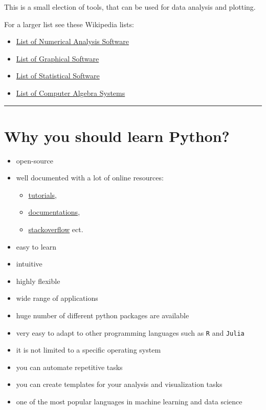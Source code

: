 \documentclass[
  letterpaper,
  DIV=11,
  numbers=noendperiod]{scrreprt}
\providecommand{\tightlist}{%
  \setlength{\itemsep}{0pt}\setlength{\parskip}{0pt}}\usepackage{longtable,booktabs,array}
\begin{document}
This is a small election of tools, that can be used for data analysis
and plotting.

For a larger list see these Wikipedia lists:

\begin{itemize}
\tightlist
\item
  \href{https://en.wikipedia.org/wiki/List_of_numerical_analysis_software}{List
  of Numerical Analysis Software}
\item
  \href{https://en.wikipedia.org/wiki/List_of_information_graphics_software}{List
  of Graphical Software}
\item
  \href{https://en.wikipedia.org/wiki/List_of_statistical_software}{List
  of Statistical Software}
\item
  \href{https://en.wikipedia.org/wiki/List_of_computer_algebra_systems}{List
  of Computer Algebra Systems}
\end{itemize}

\begin{center}\rule{0.5\linewidth}{0.5pt}\end{center}

\chapter*{Why you should learn
Python?}\label{why-you-should-learn-python}


\begin{itemize}
\tightlist
\item
  open-source
\item
  well documented with a lot of online resources:

  \begin{itemize}
  \tightlist
  \item
    \href{https://github.com/ujjwalkarn/DataSciencePython}{tutorials},
  \item
    \href{https://docs.python.org/3/}{documentations},
  \item
    \href{https://stackoverflow.com/questions}{stackoverflow} ect.
  \end{itemize}
\item
  easy to learn
\item
  intuitive
\item
  highly flexible
\item
  wide range of applications
\item
  huge number of different python packages are available
\item
  very easy to adapt to other programming languages such as \texttt{R}
  and \texttt{Julia}
\item
  it is not limited to a specific operating system
\item
  you can automate repetitive tasks
\item
  you can create templates for your analysis and visualization tasks
\item
  one of the most popular languages in machine learning and data science
\end{itemize}
\end{document}
